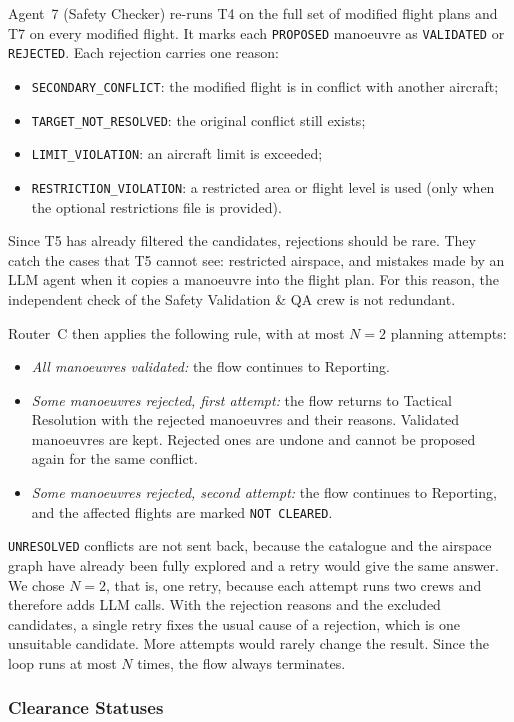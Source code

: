 Agent~7 (Safety Checker) re-runs T4 on the full set of modified flight plans and T7 on every modified flight. It marks each \texttt{PROPOSED} manoeuvre as \texttt{VALIDATED} or \texttt{REJECTED}. Each rejection carries one reason:
\begin{itemize}
    \item \texttt{SECONDARY\_CONFLICT}: the modified flight is in conflict with another aircraft;
    \item \texttt{TARGET\_NOT\_RESOLVED}: the original conflict still exists;
    \item \texttt{LIMIT\_VIOLATION}: an aircraft limit is exceeded;
    \item \texttt{RESTRICTION\_VIOLATION}: a restricted area or flight level is used (only when the optional restrictions file is provided).
\end{itemize}
Since T5 has already filtered the candidates, rejections should be rare. They catch the cases that T5 cannot see: restricted airspace, and mistakes made by an LLM agent when it copies a manoeuvre into the flight plan. For this reason, the independent check of the Safety Validation \& QA crew is not redundant.

Router~C then applies the following rule, with at most $N = 2$ planning attempts:
\begin{itemize}
    \item \emph{All manoeuvres validated:} the flow continues to Reporting.
    \item \emph{Some manoeuvres rejected, first attempt:} the flow returns to Tactical Resolution with the rejected manoeuvres and their reasons. Validated manoeuvres are kept. Rejected ones are undone and cannot be proposed again for the same conflict.
    \item \emph{Some manoeuvres rejected, second attempt:} the flow continues to Reporting, and the affected flights are marked \texttt{NOT CLEARED}.
\end{itemize}
\texttt{UNRESOLVED} conflicts are not sent back, because the catalogue and the airspace graph have already been fully explored and a retry would give the same answer. We chose $N = 2$, that is, one retry, because each attempt runs two crews and therefore adds LLM calls. With the rejection reasons and the excluded candidates, a single retry fixes the usual cause of a rejection, which is one unsuitable candidate. More attempts would rarely change the result. Since the loop runs at most $N$ times, the flow always terminates.

\subsubsection{Clearance Statuses}\label{sec:clearance-statuses}

